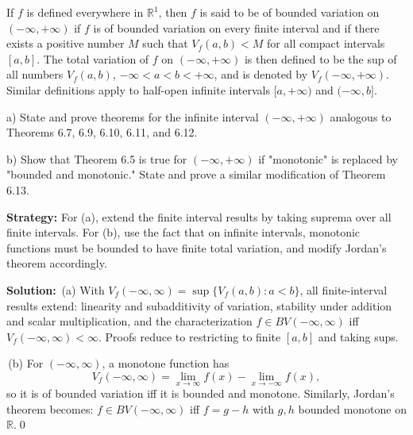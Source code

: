 \begin{problembox}
If $f$ is defined everywhere in $\mathbb{R}^1$, then $f$ is said to be of bounded variation on $(-\infty, +\infty)$ if $f$ is of bounded variation on every finite interval and if there exists a positive number $M$ such that $V_f(a, b) < M$ for all compact intervals $[a, b]$. The total variation of $f$ on $(-\infty, +\infty)$ is then defined to be the sup of all numbers $V_f(a, b)$, $-\infty < a < b < +\infty$, and is denoted by $V_f(-\infty, +\infty)$. Similar definitions apply to half-open infinite intervals $[a, +\infty)$ and $(-\infty, b]$.

a) State and prove theorems for the infinite interval $(-\infty, +\infty)$ analogous to Theorems 6.7, 6.9, 6.10, 6.11, and 6.12.

b) Show that Theorem 6.5 is true for $(-\infty, +\infty)$ if "monotonic" is replaced by "bounded and monotonic." State and prove a similar modification of Theorem 6.13.
\end{problembox}

\noindent\textbf{Strategy:} For (a), extend the finite interval results by taking suprema over all finite intervals. For (b), use the fact that on infinite intervals, monotonic functions must be bounded to have finite total variation, and modify Jordan's theorem accordingly.

\bigskip\noindent\textbf{Solution:}
\,(a) With $V_f(-\infty,\infty)=\sup\{V_f(a,b): a<b\}$, all finite-interval results extend: linearity and subadditivity of variation, stability under addition and scalar multiplication, and the characterization $f\in BV(-\infty,\infty)$ iff $V_f(-\infty,\infty)<\infty$. Proofs reduce to restricting to finite $[a,b]$ and taking sups.

\,(b) For $(-\infty,\infty)$, a monotone function has
\[V_f(-\infty,\infty)=\lim_{x\to\infty}f(x)-\lim_{x\to-\infty}f(x),\]
so it is of bounded variation iff it is bounded and monotone. Similarly, Jordan’s theorem becomes: $f\in BV(-\infty,\infty)$ iff $f=g-h$ with $g,h$ bounded monotone on $\mathbb{R}$.\qed


